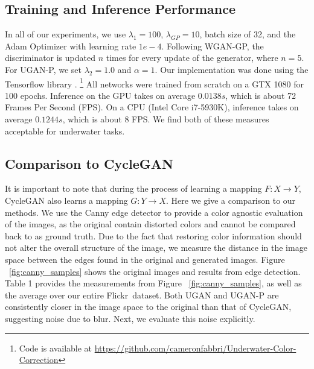 

\subsection{Training and Inference Performance}
In all of our experiments, we use $\lambda_{1} = 100$, $\lambda_{GP} = 10$, batch size of 32, and the Adam Optimizer 
\cite{kingma2014adam} with learning rate $1e-4$. Following WGAN-GP, the discriminator is updated $n$ times for every update of the 
generator, where $n = 5$. For UGAN-P, we set $\lambda_{2} = 1.0$ and $\alpha = 1$. Our implementation was done using the 
Tensorflow library \cite{abadi2016tensorflow}. \footnote{Code is available at 
\url{https://github.com/cameronfabbri/Underwater-Color-Correction}} All networks were trained from scratch on a GTX 1080 for 100 
epochs. Inference on the GPU takes on average $ 0.0138s$, which is about 72 Frames Per Second (FPS). On a CPU (Intel Core 
i7-5930K), inference takes on average $ 0.1244s$, which is about 8 FPS. We find both of these measures acceptable for underwater 
tasks.

\subsection{Comparison to CycleGAN}
It is important to note that during the process of learning a mapping $F: X \rightarrow Y$, CycleGAN also learns a
mapping $G: Y \rightarrow X$. Here we give a comparison to our methods. We use the Canny edge
detector \cite{canny1986computational} to provide a color agnostic evaluation of the images, as the original contain
distorted colors and cannot be compared back to as ground truth. Due to the fact that restoring color information
should not alter the overall structure of the image, we measure the distance in the image space between the edges
found in the original and generated images. Figure ~\ref{fig:canny_samples} shows the original images and results from
edge detection. Table 1 provides the measurements from Figure ~\ref{fig:canny_samples}, as well as the average over our
entire Flickr\texttrademark ~dataset. Both UGAN and UGAN-P are consistently closer in the image space to the original
than that of CycleGAN, suggesting noise due to blur. Next, we evaluate this noise explicitly.

